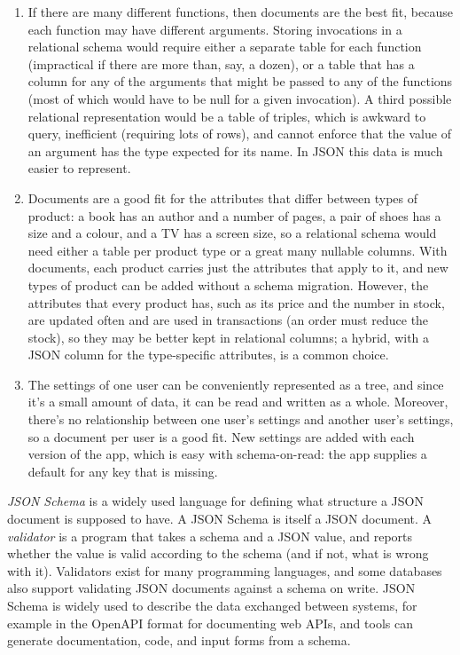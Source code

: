{\begin{enumerate}
            Embedding transfers in account documents would store each transfer twice (in the sending and the receiving account), with the risk of the two copies disagreeing.
        \item If there are many different functions, then documents are the best fit, because each function may have different arguments.
            Storing invocations in a relational schema would require either a separate table for each function (impractical if there are more than, say, a dozen), or a table that has a column for any of the arguments that might be passed to any of the functions (most of which would have to be null for a given invocation).
            A third possible relational representation would be a table of  triples, which is awkward to query, inefficient (requiring lots of rows), and cannot enforce that the value of an argument has the type expected for its name.
            In JSON this data is much easier to represent.
        \item Documents are a good fit for the attributes that differ between types of product: a book has an author and a number of pages, a pair of shoes has a size and a colour, and a TV has a screen size, so a relational schema would need either a table per product type or a great many nullable columns.
            With documents, each product carries just the attributes that apply to it, and new types of product can be added without a schema migration.
            However, the attributes that every product has, such as its price and the number in stock, are updated often and are used in transactions (an order must reduce the stock), so they may be better kept in relational columns; a hybrid, with a JSON column for the type-specific attributes, is a common choice.
        \item The settings of one user can be conveniently represented as a tree, and since it's a small amount of data, it can be read and written as a whole.
            Moreover, there's no relationship between one user's settings and another user's settings, so a document per user is a good fit.
            New settings are added with each version of the app, which is easy with schema-on-read: the app supplies a default for any key that is missing.
    \end{enumerate}
}

\emph{JSON Schema} \citep{JSONSchema2022,Pezoa2016} is a widely used language for defining what structure a JSON document is supposed to have.
A JSON Schema is itself a JSON document.
A \emph{validator} is a program that takes a schema and a JSON value, and reports whether the value is valid according to the schema (and if not, what is wrong with it).
Validators exist for many programming languages, and some databases also support validating JSON documents against a schema on write.
JSON Schema is widely used to describe the data exchanged between systems, for example in the OpenAPI format for documenting web APIs, and tools can generate documentation, code, and input forms from a schema.

